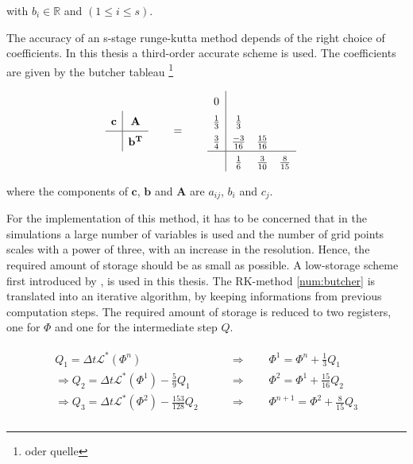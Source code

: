 with $b_i\in\mathbb{R}$ and $(1\leq i \leq s)$.

The accuracy of an s-stage runge-kutta method depends of the right choice of coefficients.
In this thesis a third-order accurate scheme is used.
The coefficients are given by the butcher tableau \citep{QUELLE}
\footnote{oder quelle}

\begin{align}
    \label{num:butcher}
    \def\arraystretch{1.5}%
    \begin{array}{c|c}
        \mathbf{c} & \mathbf{A}\\
        \hline     & \mathbf{b^T} \\
    \end{array}
    \qquad &= \qquad
    \def\arraystretch{1.5}%
    \begin{array}{c|ccc}
            0 \\
                    \frac{1}{3} & \frac{1}{3} \\
            \frac{3}{4} & \frac{-3}{16} & \frac{15}{16} \\
            \hline & \frac{1}{6} & \frac{3}{10} & \frac{8}{15}
    \end{array}
\end{align}

where the components of $\mathbf{c}$, $\mathbf{b}$ and $\mathbf{A}$ are $a_{ij}$, $b_i$ and $c_j$.

For the implementation of this method, it has to be concerned that in the simulations a large number of variables is used
and the number of grid points scales with a power of three, with an increase in the resolution.
Hence, the required amount of storage should be as small as possible.
A low-storage scheme first introduced by \citep{Williamson1980}, is used in this thesis.
The  RK-method \ref{num:butcher} is translated into an iterative algorithm, by keeping informations from previous computation steps.
The required amount of storage is reduced to two registers, one for $\Phi$ and one for the intermediate step $Q$.

\begin{align}
    \begin{split}
    Q_1 = \Delta t \mathcal{L}^*\left(\Phi^n\right)\qquad &\Rightarrow \qquad \Phi^{1} = \Phi^n + \frac{1}{3}Q_1 \\
    \Rightarrow Q_2 = \Delta t \mathcal{L}^*\left(\Phi^1\right) - \frac{5}{9} Q_1 \qquad &\Rightarrow \qquad \Phi^{2} = \Phi^1 + \frac{15}{16}Q_2 \\
   \Rightarrow  Q_3 = \Delta t \mathcal{L}^*\left(\Phi^2\right) - \frac{153}{128} Q_2 \qquad &\Rightarrow \qquad \Phi^{n+1} = \Phi^2 + \frac{8}{15}Q_3 \\
    \end{split}
\end{align}


